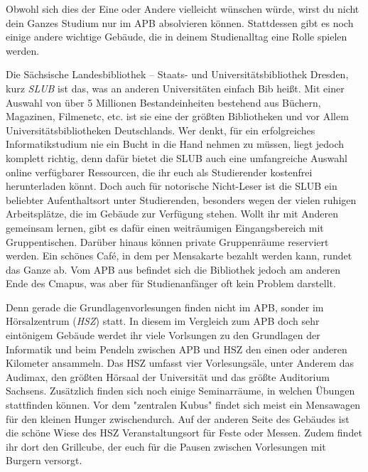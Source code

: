 
Obwohl sich dies der Eine oder Andere vielleicht wünschen würde, wirst du nicht dein Ganzes Studium nur im APB absolvieren können.
Stattdessen gibt es noch einige andere wichtige Gebäude, die in deinem Studienalltag eine Rolle spielen werden.


Die Sächsische Landesbibliothek – Staats- und Universitätsbibliothek Dresden, kurz \emph{SLUB} ist das, was an anderen Universitäten einfach Bib heißt.
Mit einer Auswahl von über 5 Millionen Bestandeinheiten bestehend aus Büchern, Magazinen, Filmenetc, etc. ist sie eine der größten Bibliotheken und vor Allem Universitätsbibliotheken Deutschlands.
Wer denkt, für ein erfolgreiches Informatikstudium nie ein Bucht in die Hand nehmen zu müssen, liegt jedoch komplett richtig, denn dafür bietet die SLUB auch eine umfangreiche Auswahl online verfügbarer Ressourcen, die ihr euch als Studierender kostenfrei herunterladen könnt.
Doch auch für notorische Nicht-Leser ist die SLUB ein beliebter Aufenthaltsort unter Studierenden, besonders wegen der vielen ruhigen Arbeitsplätze, die im Gebäude zur Verfügung stehen.
Wollt ihr mit Anderen gemeinsam lernen, gibt es dafür einen weiträumigen Eingangsbereich mit Gruppentischen.
Darüber hinaus können private Gruppenräume reserviert werden. Ein schönes Café, in dem per Mensakarte bezahlt werden kann, rundet das Ganze ab.
Vom APB aus befindet sich die Bibliothek jedoch am anderen Ende des Cmapus, was aber für Studienanfänger oft kein Problem darstellt.


Denn gerade die Grundlagenvorlesungen finden nicht im APB, sonder im Hörsalzentrum (\emph{HSZ}) statt.
In diesem im Vergleich zum APB doch sehr eintönigem Gebäude werdet ihr viele Vorlsungen zu den Grundlagen der Informatik und beim Pendeln zwischen APB und HSZ den einen oder anderen Kilometer ansammeln.
Das HSZ umfasst vier Vorlesungsäle, unter Anderem das Audimax, den größten Hörsaal der Universität und das größte Auditorium Sachsens.
Zusätzlich finden sich noch einige Seminarräume, in welchen Übungen stattfinden können. Vor dem "zentralen Kubus" findet sich meist ein Mensawagen für den kleinen Hunger zwischendurch.
Auf der anderen Seite des Gebäudes ist die schöne Wiese des HSZ Veranstaltungsort für Feste oder Messen.
Zudem findet ihr dort den Grillcube, der euch für die Pausen zwischen Vorlesungen mit Burgern versorgt.


